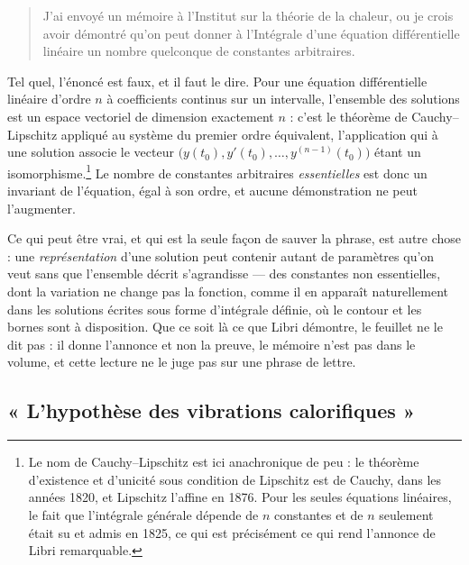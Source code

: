 \documentclass[11pt,a4paper]{article}
\begin{document}
\begin{quote}
J'ai envoyé un mémoire à l'Institut sur la théorie de la chaleur, ou je crois
avoir démontré qu'on peut donner à l'Intégrale d'une équation différentielle
linéaire un nombre quelconque de constantes arbitraires.
\end{quote}
Tel quel, l'énoncé est faux, et il faut le dire. Pour une équation
différentielle linéaire d'ordre $n$ à coefficients continus sur un intervalle,
l'ensemble des solutions est un espace vectoriel de dimension exactement $n$ :
c'est le théorème de Cauchy--Lipschitz appliqué au système du premier ordre
équivalent, l'application qui à une solution associe le vecteur
$\big(y(t_0), y'(t_0), \dots, y^{(n-1)}(t_0)\big)$ étant un
isomorphisme.\footnote{Le nom de Cauchy--Lipschitz est ici anachronique de
peu : le théorème d'existence et d'unicité sous condition de Lipschitz est de
Cauchy, dans les années 1820, et Lipschitz l'affine en 1876. Pour les seules
équations linéaires, le fait que l'intégrale générale dépende de $n$
constantes et de $n$ seulement était su et admis en 1825, ce qui est
précisément ce qui rend l'annonce de Libri remarquable.} Le nombre de
constantes arbitraires \emph{essentielles} est donc un invariant de
l'équation, égal à son ordre, et aucune démonstration ne peut l'augmenter.

Ce qui peut être vrai, et qui est la seule façon de sauver la phrase, est
autre chose : une \emph{représentation} d'une solution peut contenir autant de
paramètres qu'on veut sans que l'ensemble décrit s'agrandisse --- des
constantes non essentielles, dont la variation ne change pas la fonction,
comme il en apparaît naturellement dans les solutions écrites sous forme
d'intégrale définie, où le contour et les bornes sont à disposition. Que ce
soit là ce que Libri démontre, le feuillet ne le dit pas : il donne l'annonce
et non la preuve, le mémoire n'est pas dans le volume, et cette lecture ne le
juge pas sur une phrase de lettre.

\subsection*{« L'hypothèse des vibrations calorifiques »}
\end{document}
